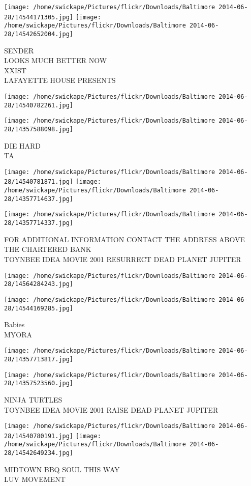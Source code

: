 \documentclass[10pt,letterpaper]{article}
\begin{document}
\texttt{[image: /home/swickape/Pictures/flickr/Downloads/Baltimore 2014-06-28/14544171305.jpg]}
\texttt{[image: /home/swickape/Pictures/flickr/Downloads/Baltimore 2014-06-28/14542652004.jpg]}

SENDER\\
LOOKS MUCH BETTER NOW\\
XXIST\\
LAFAYETTE HOUSE PRESENTS\\
\pagebreak

\texttt{[image: /home/swickape/Pictures/flickr/Downloads/Baltimore 2014-06-28/14540782261.jpg]}

\vspace{0.25in}
\texttt{[image: /home/swickape/Pictures/flickr/Downloads/Baltimore 2014-06-28/14357588098.jpg]}

DIE HARD\\
TA\\
\pagebreak

\texttt{[image: /home/swickape/Pictures/flickr/Downloads/Baltimore 2014-06-28/14540781871.jpg]}
\texttt{[image: /home/swickape/Pictures/flickr/Downloads/Baltimore 2014-06-28/14357714637.jpg]}

\vspace{0.25in}
\texttt{[image: /home/swickape/Pictures/flickr/Downloads/Baltimore 2014-06-28/14357714337.jpg]}

FOR ADDITIONAL INFORMATION CONTACT THE ADDRESS ABOVE\\
THE CHARTERED BANK\\
TOYNBEE IDEA MOVIE 2001 RESURRECT DEAD PLANET JUPITER\\
\pagebreak

\texttt{[image: /home/swickape/Pictures/flickr/Downloads/Baltimore 2014-06-28/14564284243.jpg]}

\vspace{0.25in}
\texttt{[image: /home/swickape/Pictures/flickr/Downloads/Baltimore 2014-06-28/14544169285.jpg]}

Babies\\
MYORA\\
\pagebreak

\texttt{[image: /home/swickape/Pictures/flickr/Downloads/Baltimore 2014-06-28/14357713817.jpg]}

\vspace{0.25in}
\texttt{[image: /home/swickape/Pictures/flickr/Downloads/Baltimore 2014-06-28/14357523560.jpg]}

NINJA TURTLES\\
TOYNBEE IDEA MOVIE 2001 RAISE DEAD PLANET JUPITER\\
\pagebreak

\texttt{[image: /home/swickape/Pictures/flickr/Downloads/Baltimore 2014-06-28/14540780191.jpg]}
\texttt{[image: /home/swickape/Pictures/flickr/Downloads/Baltimore 2014-06-28/14542649234.jpg]}

MIDTOWN BBQ SOUL THIS WAY\\
LUV MOVEMENT\\
\pagebreak
\end{document}
